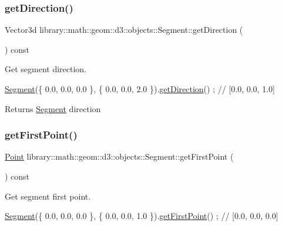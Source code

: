 \subsubsection{\texorpdfstring{get\+Direction()}{getDirection()}}
{\footnotesize\ttfamily Vector3d library\+::math\+::geom\+::d3\+::objects\+::\+Segment\+::get\+Direction (\begin{DoxyParamCaption}{ }\end{DoxyParamCaption}) const}



Get segment direction. 


\begin{DoxyCode}
\hyperlink{classlibrary_1_1math_1_1geom_1_1d3_1_1objects_1_1_segment_a5562342d1edf2f52e37ce1bc138ee7d7}{Segment}(\{ 0.0, 0.0, 0.0 \}, \{ 0.0, 0.0, 2.0 \}).\hyperlink{classlibrary_1_1math_1_1geom_1_1d3_1_1objects_1_1_segment_afc15a855d660d67e96467466c4442bbc}{getDirection}() ; \textcolor{comment}{// [0.0, 0.0, 1.0]}
\end{DoxyCode}


\begin{DoxyReturn}{Returns}
\hyperlink{classlibrary_1_1math_1_1geom_1_1d3_1_1objects_1_1_segment}{Segment} direction 
\end{DoxyReturn}
\mbox{\label{classlibrary_1_1math_1_1geom_1_1d3_1_1objects_1_1_segment_aa51ef3e713b4041f852db4201bbf7821}} 
\subsubsection{\texorpdfstring{get\+First\+Point()}{getFirstPoint()}}
{\footnotesize\ttfamily \hyperlink{classlibrary_1_1math_1_1geom_1_1d3_1_1objects_1_1_point}{Point} library\+::math\+::geom\+::d3\+::objects\+::\+Segment\+::get\+First\+Point (\begin{DoxyParamCaption}{ }\end{DoxyParamCaption}) const}



Get segment first point. 


\begin{DoxyCode}
\hyperlink{classlibrary_1_1math_1_1geom_1_1d3_1_1objects_1_1_segment_a5562342d1edf2f52e37ce1bc138ee7d7}{Segment}(\{ 0.0, 0.0, 0.0 \}, \{ 0.0, 0.0, 1.0 \}).\hyperlink{classlibrary_1_1math_1_1geom_1_1d3_1_1objects_1_1_segment_aa51ef3e713b4041f852db4201bbf7821}{getFirstPoint}() ; \textcolor{comment}{// [0.0, 0.0, 0.0]}
\end{DoxyCode}


